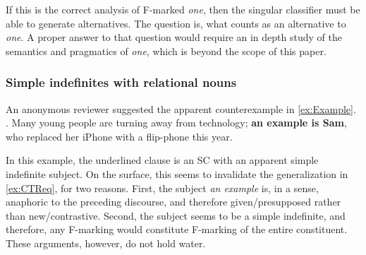 \documentclass[letterpaper]{article}
\begin{document}
If this is the correct analysis of F-marked \textit{one}, then the singular classifier must be able to generate alternatives.
The question is, what counts as an alternative to \textit{one}.
A proper answer to that question would require an in depth study of the semantics and pragmatics of \textit{one}, which is beyond the scope of this paper.
%
%

\subsubsection{Simple indefinites with relational nouns}
An anonymous reviewer suggested the apparent counterexample in \ref{ex:Example}.
\ex. \label{ex:Example} Many young people are turning away from technology; \textbf{an example is Sam}, who replaced her iPhone with a flip-phone this year.

In this example, the underlined clause is an SC with an apparent simple indefinite subject.
On the surface, this seems to invalidate the generalization in \ref{ex:CTReq}, for two reasons.
First, the subject \textit{an example} is, in a sense, anaphoric to the preceding discourse, and therefore given/presupposed rather than new/contrastive.
Second, the subject seems to be a simple indefinite, and therefore, any F-marking would constitute F-marking of the entire constituent.
These arguments, however, do not hold water.
\end{document}

